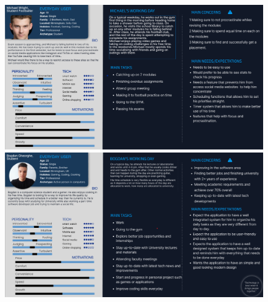 \documentclass[a4paper]{article}
\begin{document}
\begin{figure}[H] %
	\centering %
	\includegraphics[width=1\textwidth]{./images/Persona_Gilead.png} %
	\includegraphics[width=1\textwidth]{./images/Persona_Bogdan.png}
	\caption*{} %
	\label{Fig.Persona2} %
\end{figure}
\end{document}
